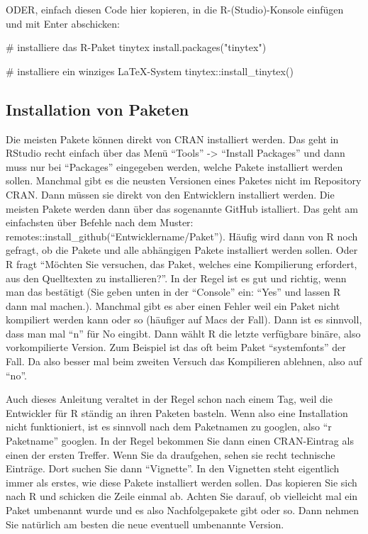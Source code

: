 \documentclass[twoside, pagesize, fontsize=11pt, dvipsnames]{scrreport}
\newenvironment{Shaded}{\begin{snugshade}}{\end{snugshade}}
\newcommand{\CommentTok}[1]{\textcolor[rgb]{0.37,0.37,0.37}{#1}}
\newcommand{\FunctionTok}[1]{\textcolor[rgb]{0.28,0.35,0.67}{#1}}
\newcommand{\NormalTok}[1]{\textcolor[rgb]{0.00,0.23,0.31}{#1}}
\newcommand{\SpecialCharTok}[1]{\textcolor[rgb]{0.37,0.37,0.37}{#1}}
\newcommand{\StringTok}[1]{\textcolor[rgb]{0.13,0.47,0.30}{#1}}
\begin{document}
ODER, einfach diesen Code hier kopieren, in die R-(Studio)-Konsole
einfügen und mit Enter abschicken:

\begin{Shaded}
\begin{Highlighting}[]
\CommentTok{\# installiere das R{-}Paket tinytex}
\FunctionTok{install.packages}\NormalTok{(}\StringTok{"tinytex"}\NormalTok{) }

\CommentTok{\# installiere ein winziges LaTeX{-}System}
\NormalTok{tinytex}\SpecialCharTok{::}\FunctionTok{install\_tinytex}\NormalTok{() }
\end{Highlighting}
\end{Shaded}

\hypertarget{installation-von-paketen}{%
\subsection{Installation von Paketen}\label{installation-von-paketen}}

Die meisten Pakete können direkt von CRAN installiert werden. Das geht
in RStudio recht einfach über das Menü \enquote{Tools} -\textgreater{}
\enquote{Install Packages} und dann muss nur bei \enquote{Packages}
eingegeben werden, welche Pakete installiert werden sollen. Manchmal
gibt es die neusten Versionen eines Paketes nicht im Repository CRAN.
Dann müssen sie direkt von den Entwicklern installiert werden. Die
meisten Pakete werden dann über das sogenannte GitHub istalliert. Das
geht am einfachsten über Befehle nach dem Muster:
remotes::install\_github(\enquote{Entwicklername/Paket}). Häufig wird
dann von R noch gefragt, ob die Pakete und alle abhängigen Pakete
installiert werden sollen. Oder R fragt \enquote{Möchten Sie versuchen,
das Paket, welches eine Kompilierung erfordert, aus den Quelltexten zu
installieren?}. In der Regel ist es gut und richtig, wenn man das
bestätigt (Sie geben unten in der \enquote{Console} ein: \enquote{Yes}
und lassen R dann mal machen.). Manchmal gibt es aber einen Fehler weil
ein Paket nicht kompiliert werden kann oder so (häufiger auf Macs der
Fall). Dann ist es sinnvoll, dass man mal \enquote{n} für No eingibt.
Dann wählt R die letzte verfügbare binäre, also vorkompilierte Version.
Zum Beispiel ist das oft beim Paket \enquote{systemfonts} der Fall. Da
also besser mal beim zweiten Versuch das Kompilieren ablehnen, also auf
\enquote{no}.

Auch dieses Anleitung veraltet in der Regel schon nach einem Tag, weil
die Entwickler für R ständig an ihren Paketen basteln. Wenn also eine
Installation nicht funktioniert, ist es sinnvoll nach dem Paketnamen zu
googlen, also \enquote{r Paketname} googlen. In der Regel bekommen Sie
dann einen CRAN-Eintrag als einen der ersten Treffer. Wenn Sie da
draufgehen, sehen sie recht technische Einträge. Dort suchen Sie dann
\enquote{Vignette}. In den Vignetten steht eigentlich immer als erstes,
wie diese Pakete installiert werden sollen. Das kopieren Sie sich nach R
und schicken die Zeile einmal ab. Achten Sie darauf, ob vielleicht mal
ein Paket umbenannt wurde und es also Nachfolgepakete gibt oder so. Dann
nehmen Sie natürlich am besten die neue eventuell umbenannte Version.
\end{document}

